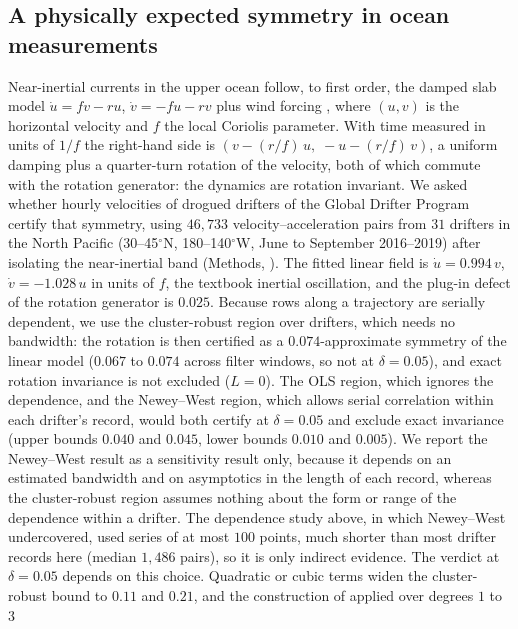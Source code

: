 \subsection{A physically expected symmetry in ocean measurements}
\label{sec:drifters}

Near-inertial currents in the upper ocean follow, to first order, the damped
slab model $\dot u = f v - r u$, $\dot v = -f u - r v$ plus wind forcing
\citep{pollard1970comparison}, where $(u,v)$ is the horizontal velocity and $f$
the local Coriolis parameter. With time measured in units of $1/f$ the
right-hand side is $(v - (r/f)\,u,\; -u - (r/f)\,v)$, a uniform damping plus a
quarter-turn rotation of the velocity, both of which commute with the rotation
generator: the dynamics are rotation invariant. We asked whether hourly
velocities of drogued drifters of the Global Drifter Program
\citep{elipot2016global,elipot2022hourly} certify that symmetry, using
$46{,}733$ velocity--acceleration pairs from $31$ drifters in the North Pacific
(30--45$^\circ$N, 180--140$^\circ$W, June to September 2016--2019) after
isolating the near-inertial band (Methods, \STdrifters). The fitted linear
field is $\dot u = 0.994\,v$, $\dot v = -1.028\,u$ in units of $f$, the
textbook inertial oscillation, and the plug-in defect of the rotation generator
is $0.025$. Because rows along a trajectory are serially dependent, we use the
cluster-robust region over drifters, which needs no bandwidth: the rotation is
then certified as a $0.074$-approximate symmetry of the linear model ($0.067$
to $0.074$ across filter windows, so not at $\delta = 0.05$), and exact
rotation invariance is not excluded ($L = 0$). The OLS region, which ignores
the dependence, and the Newey--West region, which allows serial correlation
within each drifter's record, would both certify at $\delta = 0.05$ and exclude
exact invariance (upper bounds $0.040$ and $0.045$, lower bounds $0.010$ and
$0.005$). We report the Newey--West result as a sensitivity result only,
because it depends on an estimated bandwidth and on asymptotics in the length
of each record, whereas the cluster-robust region assumes nothing about the
form or range of the dependence within a drifter. The dependence study above,
in which Newey--West undercovered, used series of at most $100$ points, much
shorter than most drifter records here (median $1{,}486$ pairs), so it is only
indirect evidence. The verdict at $\delta = 0.05$ depends on this choice.
Quadratic or cubic terms widen the cluster-robust bound to $0.11$ and $0.21$,
and the construction of  applied over degrees $1$ to $3$
